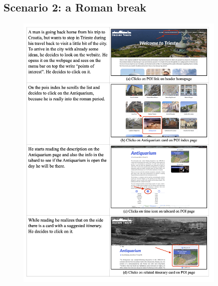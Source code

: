 \documentclass[table, 12pt]{article}
\begin{document}
\subsection{Scenario 2: a Roman break}
\begin{figure}[H]
    \begin{center}
        \includegraphics[width=0.9\textwidth]{assets/Scenarios/scenario2-1.png}
    \end{center}
\end{figure}
\end{document}
